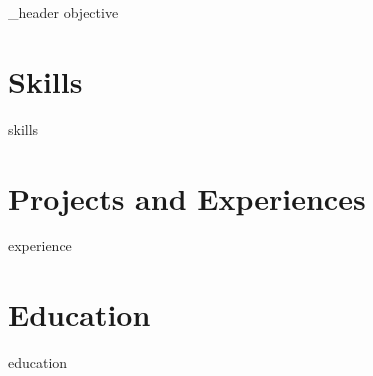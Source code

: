 \documentclass[letter,10pt]{article}
\author{Facundo Bacigalupi} %
\begin{document}
{_header}
{objective}

\section{Skills}
{skills}

\section{Projects and Experiences}
{experience}

\section{Education}
{education}

\end{document}

